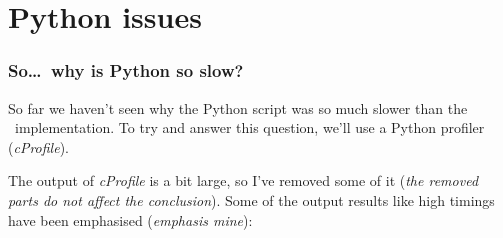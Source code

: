 
\renewcommand{\currentPart}{Python issues}

\newpage
\part{Python issues}

\section*{So\dots\ why is Python so slow?}

So far we haven't seen why the Python script was so much slower than the \gawk\ implementation. To try and answer this question, we'll use a Python profiler (\emph{cProfile}).

The output of \emph{cProfile} is a bit large, so I've removed some of it (\emph{the removed parts do not affect the conclusion}). Some of the output results like high timings have been emphasised (\emph{emphasis mine}):

